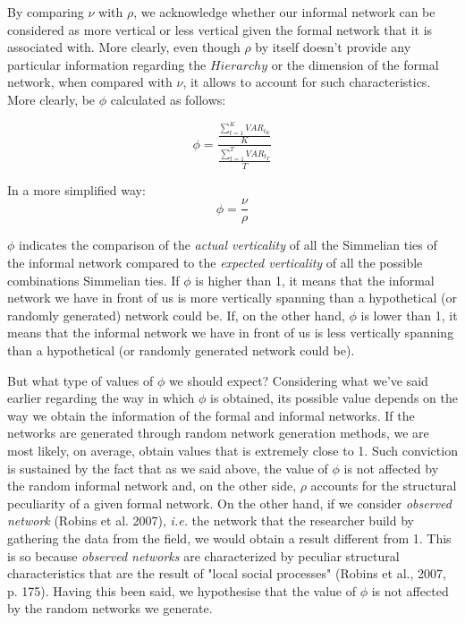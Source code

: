 \documentclass{article}
\begin{document}
By comparing $\nu$ with $\rho$, we acknowledge whether our informal network can be considered as more vertical or less vertical given the formal network that it is associated with. More clearly, even though $\rho$ by itself doesn’t provide any particular information regarding the $Hierarchy$ or the dimension of the formal network, when compared with $\nu$, it allows to account for such characteristics. 
More clearly, be $\phi$ calculated as follows:

\begin{equation}
\phi=\frac{\frac{\sum_{t=1}^{K}VAR_{t_K}}{K}}{\frac{\sum_{t=1}^{T}VAR_{t_T}}{T}}
\end{equation}

In a more simplified way:
\begin{equation}
\phi=\frac{\nu}{\rho}
\end{equation}

$\phi$ indicates the comparison of the \emph{actual verticality} of all the  Simmelian ties of the informal network compared to the \emph{expected verticality} of all the possible combinations Simmelian ties. If $\phi$ is higher than 1, it means that the informal network we have in front of us is more vertically spanning than a hypothetical (or randomly generated) network could be. If, on the other hand, $\phi$ is lower than 1, it means that the informal network we have in front of us is less vertically spanning than a hypothetical (or randomly generated network could be). 

But what type of values of $\phi$ we should expect? Considering what we've said earlier regarding the way in which $\phi$ is obtained, its possible value depends on the way we obtain the information of the formal and informal networks. If the networks are generated through random network generation methods, we are most likely, on average, obtain values that is extremely close to 1. Such conviction is sustained by the fact that as we said above, the value of $\phi$ is not affected by the random informal network and, on the other side, $\rho$ accounts for the structural peculiarity of a given formal network.
On the other hand, if we consider \emph{observed network} (Robins et al. 2007), \emph{i.e.} the network that the researcher build by gathering the data from the field, we would obtain a result different from 1. This is so because  \emph{observed networks} are characterized by peculiar structural characteristics that are the result of "local social processes" (Robins et al., 2007, p. 175). Having this been said, we hypothesise that the value of $\phi$ is not affected by the random networks we generate.
\end{document}
